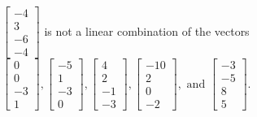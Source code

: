 \begin{exercise}
\begin{exerciseStatement}
  \end{exerciseStatement}
  \begin{exerciseAnswer}
   \(\left[\begin{array}{c}
-4 \\
3 \\
-6 \\
-4
\end{array}\right]\) 
  	 is not  
	a linear combination of the vectors \(\left[\begin{array}{c}
0 \\
0 \\
-3 \\
1
\end{array}\right] , \left[\begin{array}{c}
-5 \\
1 \\
-3 \\
0
\end{array}\right] , \left[\begin{array}{c}
4 \\
2 \\
-1 \\
-3
\end{array}\right] , \left[\begin{array}{c}
-10 \\
2 \\
0 \\
-2
\end{array}\right] , \text{ and } \left[\begin{array}{c}
-3 \\
-5 \\
8 \\
5
\end{array}\right]\).

	
  


  \end{exerciseAnswer}
\end{exercise}